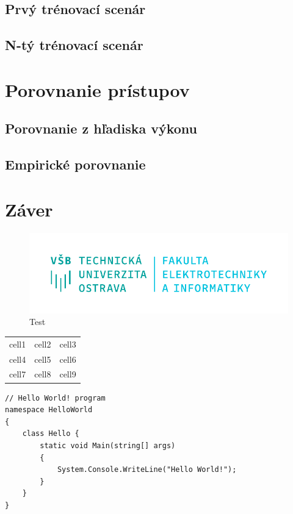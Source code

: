 \documentclass[slovak, master]{diploma}
\begin{document}
\section{Prvý trénovací scenár}
\label{sec:FirstScenario}
\section{N-tý trénovací scenár}
\label{sec:LastScenario}

\chapter{Porovnanie prístupov}
\label{sec:ImplReinforcement learning}
\section{Porovnanie z hľadiska výkonu}
\label{sec:Performance}
\section{Empirické porovnanie}
\label{sec:Gameplay}

\chapter{Záver}
\label{sec:Conclusion}

\begin{figure}[!htbp]
	\centering
	\includegraphics[width=.5\textwidth]{Figures/FEI_CZ.pdf}
	\caption{Test}
	\label{pic:Teeest}
\end{figure}

\begin{center}
\begin{tabular}{ c c c }
 cell1 & cell2 & cell3 \\ 
 cell4 & cell5 & cell6 \\  
 cell7 & cell8 & cell9    
\end{tabular}
\end{center}

\begin{lstlisting}[label=src:Test,caption={Test}]
// Hello World! program
namespace HelloWorld
{
    class Hello {         
        static void Main(string[] args)
        {
            System.Console.WriteLine("Hello World!");
        }
    }
}
\end{lstlisting}

%

\printbibliography[title={Literatúra}, heading=bibintoc]
\end{document}
